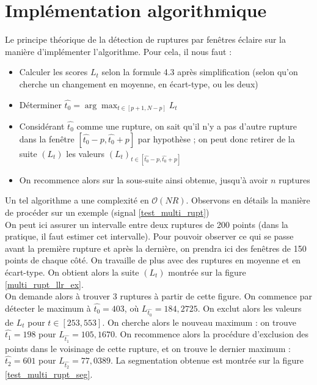 \documentclass[french,11pt,notitlepage]{report}
\begin{document}
	
	\section{Implémentation algorithmique}
	
	
	Le principe théorique de la détection de ruptures par fenêtres éclaire sur la manière d'implémenter l'algorithme. Pour cela, il nous faut :
	\begin{itemize}
		\item Calculer les scores $L_t$ selon la formule 4.3 après simplification (selon qu'on cherche un changement en moyenne, en écart-type, ou les deux)
		\item Déterminer $\hat{t_0} = \arg \max_{t \in [p+1, N-p]} L_t$
		\item Considérant $\hat{t_0}$ comme une rupture, on sait qu'il n'y a pas d'autre rupture dans la fenêtre $[\hat{t_0}-p, \hat{t_0}+p]$ par hypothèse ; on peut donc retirer de la suite $(L_t)$ les valeurs $(L_t)_{t \in [\hat{t_0}-p, \hat{t_0}+p]}$
		\item On recommence alors sur la sous-suite ainsi obtenue, jusqu'à avoir $n$ ruptures
	\end{itemize}
	
	Un tel algorithme a une complexité en $\mathcal{O}(NR)$. Observons en détails la manière de procéder sur un exemple (signal \ref{test_multi_rupt})
\\

	On peut ici assurer un intervalle entre deux ruptures de 200 points (dans la pratique, il faut estimer cet intervalle).
	Pour pouvoir observer ce qui se passe avant la première rupture et après la dernière, on prendra ici des fenêtres de 150 points de chaque côté.
	On travaille de plus avec des ruptures en moyenne et en écart-type.
	On obtient alors la suite $(L_t)$ montrée sur la figure \ref{multi_rupt_llr_ex}.
	\\
	
	On demande alors à trouver 3 ruptures à partir de cette figure.
	On commence par détecter le maximum à $\hat{t_0} = 403$, où $L_{\hat{t_0}} = 184,2725$. On exclut alors les valeurs de $L_t$ pour $t \in [253, 553]$.
	On cherche alors le nouveau maximum : on trouve $\hat{t_1} = 198$ pour $L_{\hat{t_1}} = 105,1670$.
	On recommence alors la procédure d'exclusion des points dans le voisinage de cette rupture, et on trouve le dernier maximum : $\hat{t_2} = 601$ pour $L_{\hat{t_2}} = 77,0389$.
	La segmentation obtenue est montrée sur la figure \ref{test_multi_rupt_seg}.
	
\end{document}
